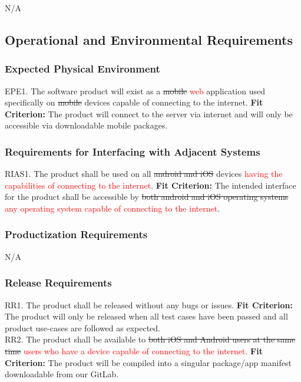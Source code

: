 \documentclass[12pt, titlepage]{article}
\begin{document}
N/A

\subsection{Operational and Environmental Requirements}

\subsubsection{Expected Physical Environment}

EPE1. The software product will exist as a \sout{mobile} \textcolor{red}{web} application used specifically on \sout{mobile} devices capable of connecting to the internet. 
	\textbf{Fit Criterion:} The product will connect to the server via internet and will only be accessible via downloadable mobile packages.

\subsubsection{Requirements for Interfacing with Adjacent Systems}

RIAS1. The product shall be used on all \sout{android and iOS} devices \textcolor{red}{having the capabilities of connecting to the internet}.
	\textbf{Fit Criterion:} The intended interface for the product shall be accessible by \sout{both android 
and iOS operating systems} \textcolor{red}{any operating system capable of connecting to the internet}.

\subsubsection{Productization Requirements}

N/A

\subsubsection{Release Requirements}

RR1. The product shall be released without any bugs or issues.
	\textbf{Fit Criterion:} The product will only be released when all test cases have been passed and all product use-cases are followed as expected.\\

\noindent RR2. The product shall be available to \sout{both iOS and Android users at the same time} \textcolor{red}{users who have a device capable of connecting to the internet}.
	\textbf{Fit Criterion:} The product will be compiled into a singular package/app manifest downloadable from our GitLab.
\end{document}
